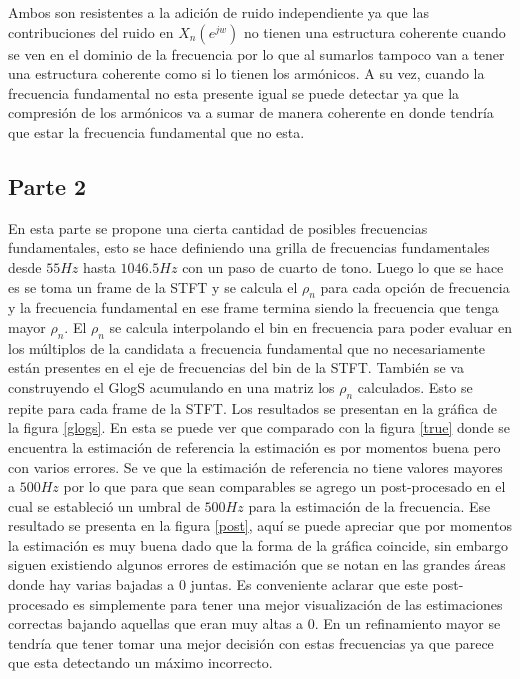 \documentclass[a4paper]{article}
\begin{document}
Ambos son resistentes a la adición de ruido independiente ya que las contribuciones del ruido en $X_n(e^{jw})$ no tienen una estructura coherente cuando se ven en el dominio de la frecuencia por lo que al sumarlos tampoco van a tener una estructura coherente como si lo tienen los armónicos. A su vez, cuando la frecuencia fundamental no esta presente igual se puede detectar ya que la compresión de los armónicos va a sumar de manera coherente en donde tendría que estar la frecuencia fundamental que no esta. 

\subsection{Parte 2}
En esta parte se propone una cierta cantidad de posibles frecuencias fundamentales, esto se hace definiendo una grilla de frecuencias fundamentales desde $55Hz$ hasta $1046.5Hz$ con un paso de cuarto de tono. Luego lo que se hace es se toma un frame de la STFT y se calcula el $\rho_n$ para cada opción de frecuencia y la frecuencia fundamental en ese frame termina siendo la frecuencia que tenga mayor $\rho_n$. El $\rho_n$ se calcula interpolando el bin en frecuencia para poder evaluar en los múltiplos de la candidata a frecuencia fundamental que no necesariamente están presentes en el eje de frecuencias del bin de la STFT. También se va construyendo el GlogS acumulando en una matriz los $\rho_n$ calculados. 
Esto se repite para cada frame de la STFT. Los resultados se presentan en la gráfica de la figura \ref{glogs}. En esta se puede ver que comparado con la figura \ref{true} donde se encuentra la estimación de referencia la estimación es por momentos buena pero con varios errores. Se ve que la estimación de referencia no tiene valores mayores a $500Hz$ por lo que para que sean comparables se agrego un post-procesado en el cual se estableció un umbral de $500Hz$ para la estimación de la frecuencia. Ese resultado se presenta en la figura \ref{post}, aquí se puede apreciar que por momentos la estimación es muy buena dado que la forma de la gráfica coincide, sin embargo siguen existiendo algunos errores de estimación que se notan en las grandes áreas donde hay varias bajadas a 0 juntas. Es conveniente aclarar que este post-procesado es simplemente para tener una mejor visualización de las estimaciones correctas bajando aquellas que eran muy altas a 0. En un refinamiento mayor se tendría que tener tomar una mejor decisión con estas frecuencias ya que parece que esta detectando un máximo incorrecto. 
\end{document}
